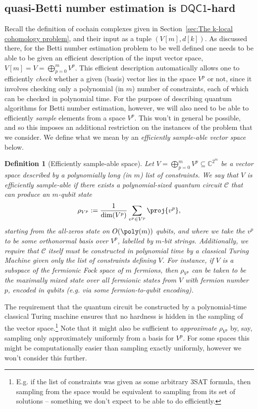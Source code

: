 \documentclass[11pt]{article}
\numberwithin{equation}{section}
\newcommand{\DQC}{\mathsf{DQC1}}
\newcommand\equ[1] {\begin{equation}#1\end{equation}}
\renewcommand\( {\left(}
\renewcommand\) {\right)}
\newtheorem{definition}{Definition}
\begin{document}
\subsection{{\sc quasi-Betti number estimation} is $\DQC$-hard}
Recall the definition of cochain complexes given in Section~\ref{sec:The k-local cohomology problem}, and their input as a tuple $(V[m],d[k])$. As discussed there, for the Betti number estimation problem to be well defined one needs to be able to be given an efficient description of the input vector space, $V[m] = V = \bigoplus_{p=0}^m V^p$.  This efficient description automatically allows one to efficiently \emph{check} whether a given (basis) vector lies in the space $V^p$ or not, since it involves checking only a polynomial (in $m$) number of constraints, each of which can be checked in polynomial time. For the purpose of describing quantum algorithms for Betti number estimation, however, we will also need to be able to efficiently \emph{sample} elements from a space $V^p$. This won't in general be possible, and so this imposes an additional restriction on the instances of the problem that we consider. We define what we mean by an \emph{efficiently sample-able vector space} below.

\begin{definition}[Efficiently sample-able space]\label{def:efficient_sample}
Let $V = \bigoplus_{p=0}^m V^p \subseteq \mathbb{C}^{2^m}$ be a vector space described by a polynomially long (in $m$) list of constraints. We say that $V$ is \emph{efficiently sample-able} if there exists a polynomial-sized quantum circuit $\mathcal{C}$ that can produce an $m$-qubit state 
\equ{
	\rho_{V^p} := \frac{1}{\dim(V^p)} \sum_{v^p \in V^p} \proj{v^p},
}
starting from the all-zeros state on $O(\poly(m))$ qubits, and where we take the $v^p$ to be some orthonormal basis over $V^p$, labelled by $m$-bit strings. Additionally, we require that $\mathcal{C}$ itself must be constructed in polynomial time by a classical Turing Machine given only the list of constraints defining $V$. For instance, if $V$ is a subspace of the fermionic Fock space of $m$ fermions, then $\rho_{V^p}$ can be taken to be the maximally mixed state over all fermionic states from $V$ with fermion number $p$, encoded in qubits (e.g. via some fermion-to-qubit encoding).
\end{definition}
The requirement that the quantum circuit be constructed by a polynomial-time classical Turing machine ensures that no hardness is hidden in the sampling of the vector space.\footnote{E.g. if the list of constraints was given as some arbitrary {\sc 3SAT} formula, then sampling from the space would be equivalent to sampling from its set of solutions -- something we don't expect to be able to do efficiently.} Note that it might also be sufficient to \emph{approximate} $\rho_{V^p}$ by, say, sampling only approximately uniformly from a basis for $V^p$. For some spaces this might be computationally easier than sampling exactly uniformly, however we won't consider this further. 
\end{document}
